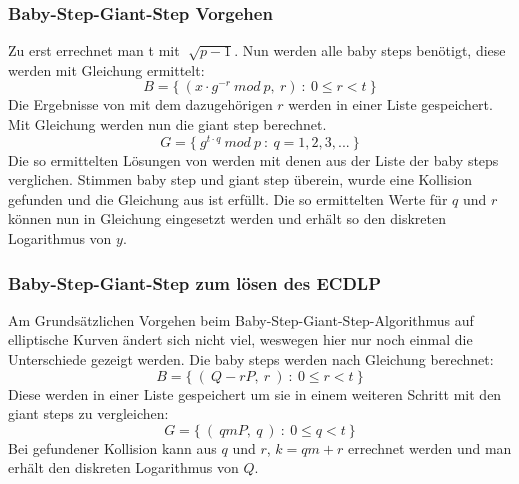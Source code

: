 		\subsubsection{Baby-Step-Giant-Step Vorgehen}
			Zu erst errechnet man t mit $\sqrt[]{p-1}$. Nun werden alle baby steps benötigt, diese werden mit Gleichung  ermittelt:
			\begin{equation}
				B = \{~(x \cdot g^{-r}~mod~p,~r)~:~0 \leq r < t~\}
			\label{Gleichung Baby steps}
			\end{equation}
			Die Ergebnisse von  mit dem dazugehörigen $r$ werden in einer Liste gespeichert. Mit Gleichung  werden nun die giant step berechnet.
			\begin{equation}
				G = \{~g^{t \cdot q}~mod~p~:~q = 1,2,3,...~\}
			\label{Gleichung Giant steps}
			\end{equation}
			Die so ermittelten Lösungen von  werden mit denen aus der Liste der baby steps verglichen. Stimmen baby step und giant step überein, wurde eine Kollision gefunden und die Gleichung aus  ist erfüllt. Die so ermittelten Werte für $q$ und $r$ können nun in Gleichung  eingesetzt werden und erhält so den diskreten Logarithmus von $y$.
		\subsubsection{Baby-Step-Giant-Step zum lösen des ECDLP}
			Am Grundsätzlichen Vorgehen beim Baby-Step-Giant-Step-Algorithmus auf elliptische Kurven ändert sich nicht viel, weswegen hier nur noch einmal die Unterschiede gezeigt werden. Die baby steps werden nach Gleichung  berechnet:
			\begin{equation}
				B = \{~(~Q- rP,~r~)~:~0 \leq r < t~\}
				\label{Gleichung Baby steps für elliptische Kurven}
			\end{equation}
			Diese werden in einer Liste gespeichert um sie in einem weiteren Schritt mit den giant steps zu vergleichen:
			\begin{equation}
				G = \{~(~qmP,~q~)~:~0 \leq q < t~\}
				\label{Gleichung Giant steps für elliptische Kurven}
			\end{equation}
			Bei gefundener Kollision kann aus $q$ und $r$, $k = qm + r$ errechnet werden und man erhält den diskreten Logarithmus von $Q$.